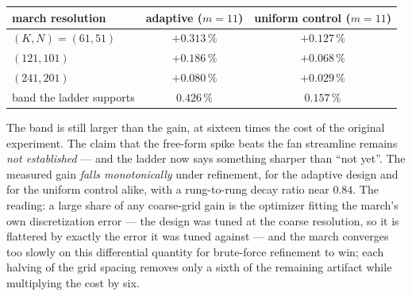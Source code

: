 \begin{center}
\begin{tabular}{lcc}
\toprule
march resolution & adaptive ($m=11$) & uniform control ($m=11$) \\
\midrule
$(K, N) = (61, 51)$    & $+0.313\,\%$ & $+0.127\,\%$ \\
$(121, 101)$           & $+0.186\,\%$ & $+0.068\,\%$ \\
$(241, 201)$           & $+0.080\,\%$ & $+0.029\,\%$ \\
\midrule
band the ladder supports & $0.426\,\%$ & $0.157\,\%$ \\
\bottomrule
\end{tabular}
\end{center}

\noindent The band is still larger than the gain, at sixteen times
the cost of the original experiment. The claim that the free-form
spike beats the fan streamline remains \emph{not established} --- and
the ladder now says something sharper than ``not yet''. The measured
gain \emph{falls monotonically} under refinement, for the adaptive
design and for the uniform control alike, with a rung-to-rung decay
ratio near $0.84$. The reading: a large share of any coarse-grid gain
is the optimizer fitting the march's own discretization error ---
the design was tuned at the coarse resolution, so it is flattered by
exactly the error it was tuned against --- and the march converges
too slowly on this differential quantity for brute-force refinement
to win; each halving of the grid spacing removes only a sixth of the
remaining artifact while multiplying the cost by six.


